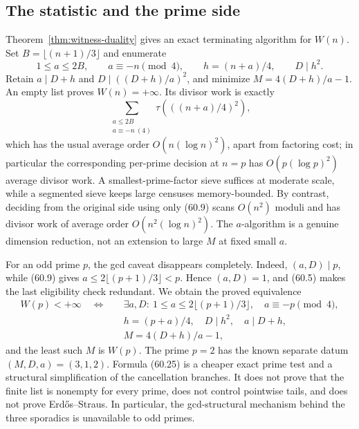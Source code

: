 \documentclass[10pt,reqno]{amsart}
\theoremstyle{definition}
\newcommand{\1}{\mathbf 1}
\begin{document}
\subsection{The statistic and the prime side}
Theorem~\ref{thm:witness-duality} gives an exact terminating algorithm for
$W(n)$.  Set $B=\lfloor(n+1)/3\rfloor$ and enumerate
\begin{equation}\tag{60.23}
 1\leq a\leq2B,\qquad a\equiv-n\pmod4,\qquad
 h=(n+a)/4,\qquad D\mid h^2.
\end{equation}
Retain $a\mid D+h$ and $D\mid((D+h)/a)^2$, and minimize
$M=4(D+h)/a-1$.  An empty list proves $W(n)=+\infty$.  Its divisor work is
exactly
\begin{equation}\tag{60.24}
 \sum_{\substack{a\leq2B\\a\equiv-n\ (4)}}
 \tau\!\left(((n+a)/4)^2\right),
\end{equation}
which has the usual average order $O(n(\log n)^2)$, apart from factoring
cost; in particular the corresponding per-prime decision at $n=p$ has
$O(p(\log p)^2)$ average divisor work.  A smallest-prime-factor sieve
suffices at moderate scale, while a segmented sieve keeps large censuses
memory-bounded.  By contrast, deciding from the original side using only
(60.9) scans $O(n^2)$ moduli and has divisor work of average order
$O(n^2(\log n)^2)$.  The $a$-algorithm is a genuine dimension reduction,
not an extension to large $M$ at fixed small $a$.

For an odd prime $p$, the gcd caveat disappears completely.  Indeed,
$(a,D)\mid p$, while (60.9) gives
$a\leq2\lfloor(p+1)/3\rfloor<p$.  Hence $(a,D)=1$, and (60.5) makes the
last eligibility check redundant.  We obtain the proved equivalence
\begin{equation}\tag{60.25}
\begin{split}
 W(p)<+\infty\quad\Longleftrightarrow\quad
 &\exists a,D:\ 1\leq a\leq2\lfloor(p+1)/3\rfloor,
       \quad a\equiv-p\pmod4,\\
 &h=(p+a)/4,\quad D\mid h^2,\quad a\mid D+h,\\
 &M=4(D+h)/a-1,
\end{split}
\end{equation}
and the least such $M$ is $W(p)$.  The prime $p=2$ has the known separate
datum $(M,D,a)=(3,1,2)$.  Formula (60.25) is a cheaper exact prime test and
a structural simplification of the cancellation branches.  It does not
prove that the finite list is nonempty for every prime, does not control
pointwise tails, and does not prove Erd\H{o}s--Straus.  In particular, the
gcd-structural mechanism behind the three sporadics is unavailable to odd
primes.
\end{document}
